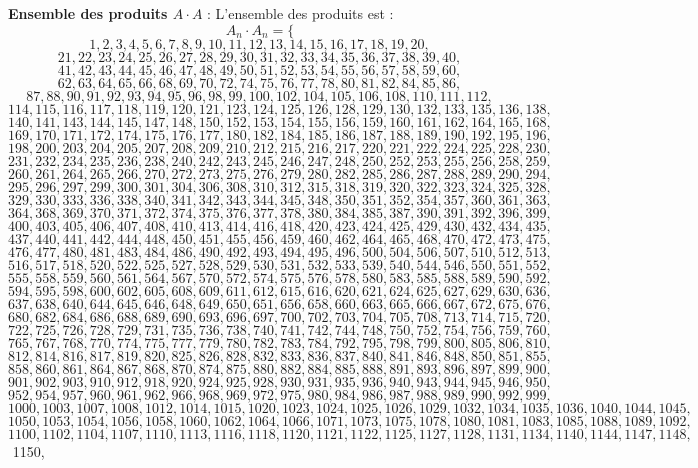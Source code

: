 \documentclass[11pt,a4paper]{article}
\begin{document}
\textbf{Ensemble des produits $A \cdot A$} :
L'ensemble des produits est :
$$ A_{{{n}}} \cdot A_{{{n}}} = \{ $$$$ 1, 2, 3, 4, 5, 6, 7, 8, 9, 10, 11, 12, 13, 14, 15, 16, 17, 18, 19, 20, $$$$ 21, 22, 23, 24, 25, 26, 27, 28, 29, 30, 31, 32, 33, 34, 35, 36, 37, 38, 39, 40, $$$$ 41, 42, 43, 44, 45, 46, 47, 48, 49, 50, 51, 52, 53, 54, 55, 56, 57, 58, 59, 60, $$$$ 62, 63, 64, 65, 66, 68, 69, 70, 72, 74, 75, 76, 77, 78, 80, 81, 82, 84, 85, 86, $$$$ 87, 88, 90, 91, 92, 93, 94, 95, 96, 98, 99, 100, 102, 104, 105, 106, 108, 110, 111, 112, $$$$ 114, 115, 116, 117, 118, 119, 120, 121, 123, 124, 125, 126, 128, 129, 130, 132, 133, 135, 136, 138, $$$$ 140, 141, 143, 144, 145, 147, 148, 150, 152, 153, 154, 155, 156, 159, 160, 161, 162, 164, 165, 168, $$$$ 169, 170, 171, 172, 174, 175, 176, 177, 180, 182, 184, 185, 186, 187, 188, 189, 190, 192, 195, 196, $$$$ 198, 200, 203, 204, 205, 207, 208, 209, 210, 212, 215, 216, 217, 220, 221, 222, 224, 225, 228, 230, $$$$ 231, 232, 234, 235, 236, 238, 240, 242, 243, 245, 246, 247, 248, 250, 252, 253, 255, 256, 258, 259, $$$$ 260, 261, 264, 265, 266, 270, 272, 273, 275, 276, 279, 280, 282, 285, 286, 287, 288, 289, 290, 294, $$$$ 295, 296, 297, 299, 300, 301, 304, 306, 308, 310, 312, 315, 318, 319, 320, 322, 323, 324, 325, 328, $$$$ 329, 330, 333, 336, 338, 340, 341, 342, 343, 344, 345, 348, 350, 351, 352, 354, 357, 360, 361, 363, $$$$ 364, 368, 369, 370, 371, 372, 374, 375, 376, 377, 378, 380, 384, 385, 387, 390, 391, 392, 396, 399, $$$$ 400, 403, 405, 406, 407, 408, 410, 413, 414, 416, 418, 420, 423, 424, 425, 429, 430, 432, 434, 435, $$$$ 437, 440, 441, 442, 444, 448, 450, 451, 455, 456, 459, 460, 462, 464, 465, 468, 470, 472, 473, 475, $$$$ 476, 477, 480, 481, 483, 484, 486, 490, 492, 493, 494, 495, 496, 500, 504, 506, 507, 510, 512, 513, $$$$ 516, 517, 518, 520, 522, 525, 527, 528, 529, 530, 531, 532, 533, 539, 540, 544, 546, 550, 551, 552, $$$$ 555, 558, 559, 560, 561, 564, 567, 570, 572, 574, 575, 576, 578, 580, 583, 585, 588, 589, 590, 592, $$$$ 594, 595, 598, 600, 602, 605, 608, 609, 611, 612, 615, 616, 620, 621, 624, 625, 627, 629, 630, 636, $$$$ 637, 638, 640, 644, 645, 646, 648, 649, 650, 651, 656, 658, 660, 663, 665, 666, 667, 672, 675, 676, $$$$ 680, 682, 684, 686, 688, 689, 690, 693, 696, 697, 700, 702, 703, 704, 705, 708, 713, 714, 715, 720, $$$$ 722, 725, 726, 728, 729, 731, 735, 736, 738, 740, 741, 742, 744, 748, 750, 752, 754, 756, 759, 760, $$$$ 765, 767, 768, 770, 774, 775, 777, 779, 780, 782, 783, 784, 792, 795, 798, 799, 800, 805, 806, 810, $$$$ 812, 814, 816, 817, 819, 820, 825, 826, 828, 832, 833, 836, 837, 840, 841, 846, 848, 850, 851, 855, $$$$ 858, 860, 861, 864, 867, 868, 870, 874, 875, 880, 882, 884, 885, 888, 891, 893, 896, 897, 899, 900, $$$$ 901, 902, 903, 910, 912, 918, 920, 924, 925, 928, 930, 931, 935, 936, 940, 943, 944, 945, 946, 950, $$$$ 952, 954, 957, 960, 961, 962, 966, 968, 969, 972, 975, 980, 984, 986, 987, 988, 989, 990, 992, 999, $$$$ 1000, 1003, 1007, 1008, 1012, 1014, 1015, 1020, 1023, 1024, 1025, 1026, 1029, 1032, 1034, 1035, 1036, 1040, 1044, 1045, $$$$ 1050, 1053, 1054, 1056, 1058, 1060, 1062, 1064, 1066, 1071, 1073, 1075, 1078, 1080, 1081, 1083, 1085, 1088, 1089, 1092, $$$$ 1100, 1102, 1104, 1107, 1110, 1113, 1116, 1118, 1120, 1121, 1122, 1125, 1127, 1128, 1131, 1134, 1140, 1144, 1147, 1148, $$$$ 1150, 
\end{document}
